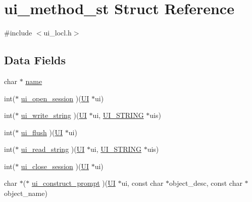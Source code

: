 \hypertarget{structui__method__st}{}\section{ui\+\_\+method\+\_\+st Struct Reference}
\label{structui__method__st}


{\ttfamily \#include $<$ui\+\_\+locl.\+h$>$}

\subsection*{Data Fields}
\begin{DoxyCompactItemize}
\item 
char $\ast$ \hyperlink{structui__method__st_a5ac083a645d964373f022d03df4849c8}{name}
\item 
int($\ast$ \hyperlink{structui__method__st_a4ac58de890816b0a78fc4ef9f89c13bb}{ui\+\_\+open\+\_\+session} )(\hyperlink{crypto_2ossl__typ_8h_a6d33d9edda43df62e1a22da5da91381a}{UI} $\ast$ui)
\item 
int($\ast$ \hyperlink{structui__method__st_a5c215bfe8b7cff90102987a354eeeadd}{ui\+\_\+write\+\_\+string} )(\hyperlink{crypto_2ossl__typ_8h_a6d33d9edda43df62e1a22da5da91381a}{UI} $\ast$ui, \hyperlink{crypto_2ui_2ui_8h_ac00ec05cf702eb7ebfa365ae2ba7d7d2}{U\+I\+\_\+\+S\+T\+R\+I\+NG} $\ast$uis)
\item 
int($\ast$ \hyperlink{structui__method__st_a3df0fea4eab137d6b5ccbe2056346a82}{ui\+\_\+flush} )(\hyperlink{crypto_2ossl__typ_8h_a6d33d9edda43df62e1a22da5da91381a}{UI} $\ast$ui)
\item 
int($\ast$ \hyperlink{structui__method__st_aa2112a3101f630bcfd5b05ed2d688a96}{ui\+\_\+read\+\_\+string} )(\hyperlink{crypto_2ossl__typ_8h_a6d33d9edda43df62e1a22da5da91381a}{UI} $\ast$ui, \hyperlink{crypto_2ui_2ui_8h_ac00ec05cf702eb7ebfa365ae2ba7d7d2}{U\+I\+\_\+\+S\+T\+R\+I\+NG} $\ast$uis)
\item 
int($\ast$ \hyperlink{structui__method__st_a43c348f8c59960a5b687512088a46a7d}{ui\+\_\+close\+\_\+session} )(\hyperlink{crypto_2ossl__typ_8h_a6d33d9edda43df62e1a22da5da91381a}{UI} $\ast$ui)
\item 
char $\ast$($\ast$ \hyperlink{structui__method__st_a7aa00ed8959cdab8281400dcfbe351b5}{ui\+\_\+construct\+\_\+prompt} )(\hyperlink{crypto_2ossl__typ_8h_a6d33d9edda43df62e1a22da5da91381a}{UI} $\ast$ui, const char $\ast$object\+\_\+desc, const char $\ast$object\+\_\+name)
\end{DoxyCompactItemize}


